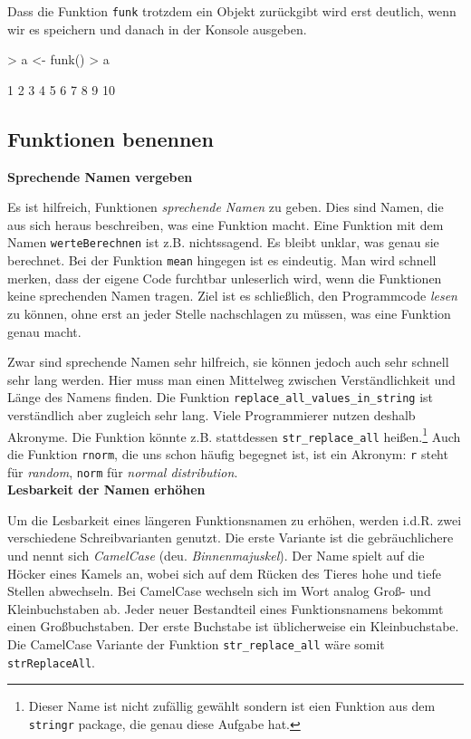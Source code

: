 \documentclass[12pt, a4paper,twoside,openany,x11names,svgnames]{memoir}
\begin{document}
Dass die Funktion \texttt{funk} trotzdem ein Objekt zurückgibt wird erst deutlich, wenn wir es speichern und danach in der Konsole ausgeben.

\begin{Schunk}
\begin{Sinput}
> a <- funk()
> a
\end{Sinput}
\begin{Soutput}
 [1]  1  2  3  4  5  6  7  8  9 10
\end{Soutput}
\end{Schunk}



\subsection{Funktionen benennen}

\textbf{Sprechende Namen vergeben}

Es ist hilfreich, Funktionen \emph{sprechende Namen} zu geben. Dies sind Namen, die aus sich heraus beschreiben, was eine Funktion macht. Eine Funktion mit dem Namen \texttt{werteBerechnen} ist z.B. nichtssagend. Es bleibt unklar, was genau sie berechnet. Bei der Funktion \texttt{mean} hingegen ist es eindeutig. Man wird schnell merken, dass der eigene Code furchtbar unleserlich wird, wenn die Funktionen keine sprechenden Namen tragen. Ziel ist es schließlich, den Programmcode \emph{lesen} zu können, ohne erst an jeder Stelle nachschlagen zu müssen, was eine Funktion genau macht.

Zwar sind sprechende Namen sehr hilfreich, sie können jedoch auch sehr schnell sehr lang werden. Hier muss man einen Mittelweg zwischen Verständlichkeit und Länge des Namens finden. Die Funktion \verb+replace_all_values_in_string+ ist verständlich aber zugleich sehr lang. Viele Programmierer nutzen deshalb Akronyme. Die Funktion könnte z.B. stattdessen \verb+str_replace_all+ heißen.\footnote{Dieser Name ist nicht zufällig gewählt sondern ist eien Funktion aus dem \texttt{stringr} package, die genau diese Aufgabe hat.} Auch die Funktion \texttt{rnorm}, die uns schon häufig begegnet ist, ist ein Akronym: \texttt{r} steht für \emph{random}, \texttt{norm} für \emph{normal distribution}. \\


\textbf{Lesbarkeit der Namen erhöhen}

Um die Lesbarkeit eines längeren Funktionsnamen zu erhöhen, werden i.d.R. zwei verschiedene Schreibvarianten genutzt. Die erste Variante ist die gebräuchlichere und nennt sich \emph{CamelCase} (deu. \emph{Binnenmajuskel}). Der Name spielt auf die  Höcker eines Kamels an, wobei sich auf dem Rücken des Tieres hohe und tiefe Stellen abwechseln. Bei CamelCase wechseln sich im Wort analog Groß- und Kleinbuchstaben ab. Jeder neuer Bestandteil eines Funktionsnamens bekommt einen Großbuchstaben. Der erste Buchstabe ist üblicherweise ein Kleinbuchstabe. Die CamelCase Variante der Funktion \verb+str_replace_all+ wäre somit \texttt{strReplaceAll}.
\end{document}
